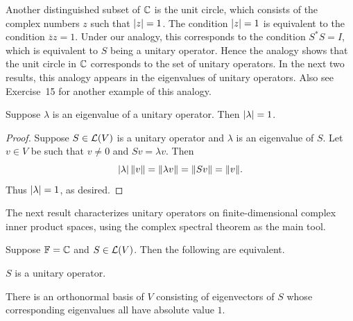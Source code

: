 Another distinguished subset of $\mathbb{C}$ is the unit circle, which consists of the
complex numbers $z$ such that $\lvert z \rvert=1$. The condition $\lvert z \rvert=1$ is
equivalent to the condition $\overline{z}z=1$. Under our analogy, this
corresponds to the condition $S^*S=I$, which is equivalent to $S$ being a
unitary operator. Hence the analogy shows that the unit circle in $\mathbb{C}$
corresponds to the set of unitary operators. In the next two results, this
analogy appears in the eigenvalues of unitary operators. Also see Exercise~15
for another example of this analogy.

\begin{result}%
\label{ax:7.54}
Suppose $\lambda$ is an eigenvalue of a unitary operator. Then $\lvert \lambda \rvert=1$.
\end{result}

\begin{proof}
Suppose $S\in\mathcal{L}(V)$ is a unitary operator and $\lambda$ is an eigenvalue of
$S$. Let $v\in V$ be such that $v\ne0$ and $Sv=\lambda v$. Then
\[ \lvert \lambda \rvert\,\lVert v \rVert=\lVert \lambda v \rVert=\lVert Sv \rVert=\lVert v \rVert. \]
Thus $\lvert \lambda \rvert=1$, as desired.
\end{proof}

The next result characterizes unitary operators on finite-dimensional complex
inner product spaces, using the complex spectral theorem as the main tool.

\begin{result}%
\label{ax:7.55}
Suppose $\mathbb{F}=\mathbb{C}$ and $S\in\mathcal{L}(V)$. Then the following are equivalent.
\begin{parts}
\item $S$ is a unitary operator.
\item There is an orthonormal basis of $V$ consisting of eigenvectors of $S$
  whose corresponding eigenvalues all have absolute value $1$.
\end{parts}
\end{result}

